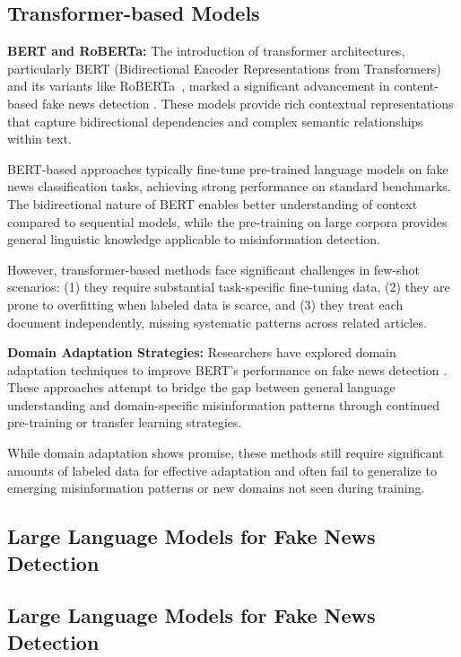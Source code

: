 \subsection{Transformer-based Models}

\textbf{BERT and RoBERTa:} The introduction of transformer architectures, particularly BERT (Bidirectional Encoder Representations from Transformers)~\cite{devlin2018bert} and its variants like RoBERTa~\cite{liu2019roberta}, marked a significant advancement in content-based fake news detection \cite{kula2021survey, kaliyar2021fakebert}. These models provide rich contextual representations that capture bidirectional dependencies and complex semantic relationships within text.

BERT-based approaches typically fine-tune pre-trained language models on fake news classification tasks, achieving strong performance on standard benchmarks. The bidirectional nature of BERT enables better understanding of context compared to sequential models, while the pre-training on large corpora provides general linguistic knowledge applicable to misinformation detection.

However, transformer-based methods face significant challenges in few-shot scenarios: (1) they require substantial task-specific fine-tuning data, (2) they are prone to overfitting when labeled data is scarce, and (3) they treat each document independently, missing systematic patterns across related articles.

\textbf{Domain Adaptation Strategies:} Researchers have explored domain adaptation techniques to improve BERT's performance on fake news detection \cite{wright2020domain, silva2021cross}. These approaches attempt to bridge the gap between general language understanding and domain-specific misinformation patterns through continued pre-training or transfer learning strategies.

While domain adaptation shows promise, these methods still require significant amounts of labeled data for effective adaptation and often fail to generalize to emerging misinformation patterns or new domains not seen during training.

\subsection{Large Language Models for Fake News Detection}

\subsection{Large Language Models for Fake News Detection}

